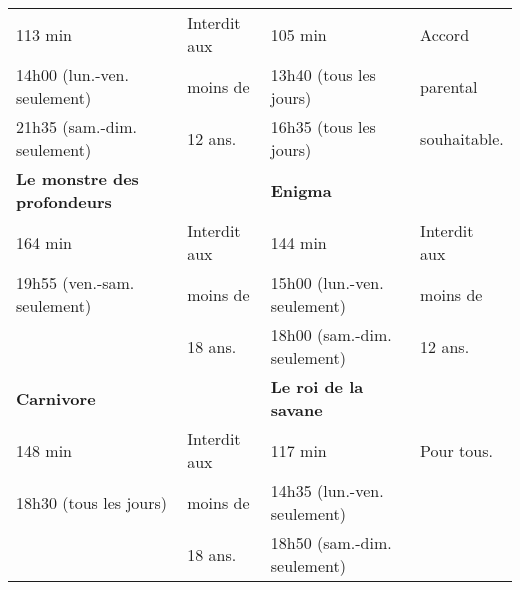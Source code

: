 \begin{enigme}
\begin{changemargin}{-10mm}{-10mm}
\begin{center}
{\begin{tabular}{|p{4cm}p{1.8cm}|p{4cm}p{1.8cm}|}
                113 min & Interdit aux & 105 min & Accord \\
                14h00 (lun.-ven. seulement) & moins de & 13h40 (tous les jours) & parental \\
                21h35 (sam.-dim. seulement) & 12 ans. & 16h35 (tous les jours) & souhaitable. \\
                \hline
                \bf Le monstre des profondeurs & & \bf Enigma & \\
                164 min & Interdit aux & 144 min & Interdit aux \\
                19h55 (ven.-sam. seulement) & moins de & 15h00 (lun.-ven. seulement) & moins de \\
                & 18 ans. & 18h00 (sam.-dim. seulement) & 12 ans. \\
                \hline
                \bf Carnivore & & \bf Le roi de la savane & \\
                148 min & Interdit aux & 117 min & Pour tous. \\
                18h30 (tous les jours) & moins de & 14h35 (lun.-ven. seulement) & \\
                & 18 ans. & 18h50 (sam.-dim. seulement) & \\
                \hline
            \end{tabular}}
        \end{center}


\end{changemargin}
\end{enigme}
